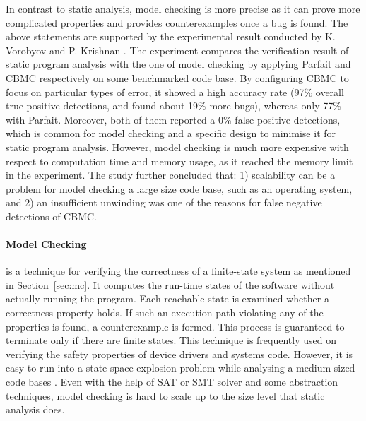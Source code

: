 In contrast to static analysis, model checking is more precise as it can prove more complicated properties and provides counterexamples once a bug is found. The above statements are supported by the experimental result conducted by K. Vorobyov and P. Krishnan \cite{vorobyov2010comparing}. The experiment compares the verification result of static program analysis with the one of model checking by applying Parfait and CBMC respectively on some benchmarked code base. By configuring CBMC to focus on particular types of error, it showed a high accuracy rate (97\% overall true positive detections, and found about 19\% more bugs), whereas only 77\% with Parfait. Moreover, both of them reported a 0\% false positive detections, which is common for model checking and a specific design to minimise it for static program analysis. However, model checking is much more expensive with respect to computation time and memory usage, as it reached the memory limit in the experiment. The study further concluded that: 1) scalability can be a problem for model checking a large size code base, such as an operating system, and 2) an insufficient unwinding was one of the reasons for false negative detections of CBMC.

\paragraph{Model Checking} is a technique for verifying the correctness of a finite-state system as mentioned in Section~\ref{sec:mc}. It computes the run-time states of the software without actually running the program. Each reachable state is examined whether a correctness property holds. If such an execution path violating any of the properties is found, a counterexample is formed. This process is guaranteed to terminate only if there are finite states. This technique is frequently used on verifying the safety properties of device drivers and systems code. However, it is easy to run into a state space explosion problem while analysing a medium sized code bases \cite{Yeolekar2013}. Even with the help of SAT or SMT solver and some abstraction techniques, model checking is hard to scale up to the size level that static analysis does. 

